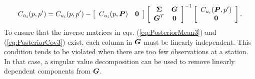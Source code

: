 \documentclass[extra,mreferee]{gji}
\begin{document}
\begin{equation}\label{eq:PosteriorCov3}
C_{\hat{u}_i}(p,p') = C_{u_i}(p,p') - 
                    \left[\begin{array}{cc}
                          C_{u_i}(p,\mitbf{P}) & \mitbf{0} \\
                          \end{array}\right]
                    \left[\begin{array}{cc}
                          \mitbf{\Sigma} & \mitbf{G} \\
                          \mitbf{G}^T  & \mitbf{0} \\
                          \end{array}\right]^{-1}
                    \left[\begin{array}{c}
                          C_{u_i}(\mitbf{P},p') \\
                          \mitbf{0} \\
                          \end{array}\right].
\end{equation}
To ensure that the inverse matrices in eqs. (\ref{eq:PosteriorMean3}) and (\ref{eq:PosteriorCov3}) exist, each column in $\mitbf{G}$ must be linearly independent. This condition tends to be violated when there are too few observations at a station. In that case, a singular value decomposition can be used to remove linearly dependent components from $\mitbf{G}$.   
\end{document}
